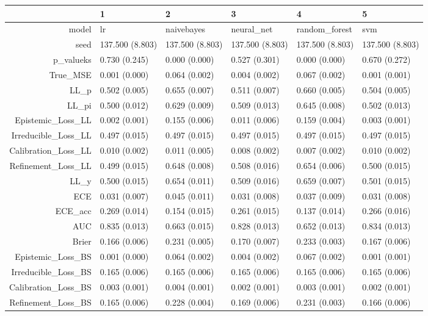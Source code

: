 \begin{table}[ht]
\centering
\begin{tabular}{rlllll}
  \hline
 & 1 & 2 & 3 & 4 & 5 \\ 
  \hline
model & lr & naivebayes & neural\_net & random\_forest & svm \\ 
  seed & 137.500 (8.803) & 137.500 (8.803) & 137.500 (8.803) & 137.500 (8.803) & 137.500 (8.803) \\ 
  p\_valueks & 0.730 (0.245) & 0.000 (0.000) & 0.527 (0.301) & 0.000 (0.000) & 0.670 (0.272) \\ 
  True\_MSE & 0.001 (0.000) & 0.064 (0.002) & 0.004 (0.002) & 0.067 (0.002) & 0.001 (0.001) \\ 
  LL\_p & 0.502 (0.005) & 0.655 (0.007) & 0.511 (0.007) & 0.660 (0.005) & 0.504 (0.005) \\ 
  LL\_pi & 0.500 (0.012) & 0.629 (0.009) & 0.509 (0.013) & 0.645 (0.008) & 0.502 (0.013) \\ 
  Epistemic\_Loss\_LL & 0.002 (0.001) & 0.155 (0.006) & 0.011 (0.006) & 0.159 (0.004) & 0.003 (0.001) \\ 
  Irreducible\_Loss\_LL & 0.497 (0.015) & 0.497 (0.015) & 0.497 (0.015) & 0.497 (0.015) & 0.497 (0.015) \\ 
  Calibration\_Loss\_LL & 0.010 (0.002) & 0.011 (0.005) & 0.008 (0.002) & 0.007 (0.002) & 0.010 (0.002) \\ 
  Refinement\_Loss\_LL & 0.499 (0.015) & 0.648 (0.008) & 0.508 (0.016) & 0.654 (0.006) & 0.500 (0.015) \\ 
  LL\_y & 0.500 (0.015) & 0.654 (0.011) & 0.509 (0.016) & 0.659 (0.007) & 0.501 (0.015) \\ 
  ECE & 0.031 (0.007) & 0.045 (0.011) & 0.031 (0.008) & 0.037 (0.009) & 0.031 (0.008) \\ 
  ECE\_acc & 0.269 (0.014) & 0.154 (0.015) & 0.261 (0.015) & 0.137 (0.014) & 0.266 (0.016) \\ 
  AUC & 0.835 (0.013) & 0.663 (0.015) & 0.828 (0.013) & 0.652 (0.013) & 0.834 (0.013) \\ 
  Brier & 0.166 (0.006) & 0.231 (0.005) & 0.170 (0.007) & 0.233 (0.003) & 0.167 (0.006) \\ 
  Epistemic\_Loss\_BS & 0.001 (0.000) & 0.064 (0.002) & 0.004 (0.002) & 0.067 (0.002) & 0.001 (0.001) \\ 
  Irreducible\_Loss\_BS & 0.165 (0.006) & 0.165 (0.006) & 0.165 (0.006) & 0.165 (0.006) & 0.165 (0.006) \\ 
  Calibration\_Loss\_BS & 0.003 (0.001) & 0.004 (0.001) & 0.002 (0.001) & 0.003 (0.001) & 0.002 (0.001) \\ 
  Refinement\_Loss\_BS & 0.165 (0.006) & 0.228 (0.004) & 0.169 (0.006) & 0.231 (0.003) & 0.166 (0.006) \\ 
   \hline
\end{tabular}
\end{table}
